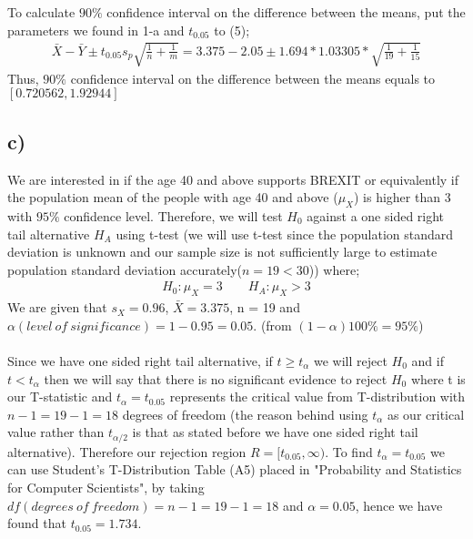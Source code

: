 \documentclass[12pt]{article}
\begin{document}
To calculate $90\%$ confidence interval on the difference between the means, put  the parameters we found in 1-a and  $t_{0.05}$ to (5);
\begin{equation} 
\begin{split}
\bar{X} - \bar{Y} \pm t_{0.05}s_{p}\sqrt{\frac{1}{n}+\frac{1}{m}} = 3.375-2.05 \pm 1.694*1.03305*\sqrt{\frac{1}{19}+\frac{1}{15}}
\end{split}
\end{equation}
Thus, $90\%$ confidence interval on the difference between the means equals to $[0.720562,1.92944]$

\subsection*{c)} We are interested in if the age 40 and above supports BREXIT or equivalently if the population mean of the people with age 40 and above ($\mu_{X}$)  is higher than 3 with $95\%$ confidence level. Therefore, we will test $H_{0}$ against a one sided right tail alternative $H_{A}$ using t-test (we will use t-test since the population standard deviation is unknown and our sample size is not sufficiently large to estimate population standard deviation accurately($n=19 < 30$)) where;
\begin{equation} 
\begin{split}
H_{0}: \mu_{X} = 3 \qquad H_{A}: \mu_{X} > 3
\end{split}
\end{equation}
We are given that $s_{X} = 0.96$, $\bar{X} = 3.375$, n = 19 and $\alpha (level \ of \ significance) = 1 - 0.95 = 0.05$. (from $(1-\alpha)100\% = 95\%$) \\ \\ 
Since we have one sided right tail alternative, if $t \geq t_{\alpha}$ we will reject $H_{0}$ and if $t < t_{\alpha}$ then we will say that there is no significant evidence to reject $H_{0}$ where t is our T-statistic and $t_{\alpha} = t_{0.05}$ represents the critical value from T-distribution with $n-1 = 19 -1 = 18$ degrees of freedom (the reason behind using $t_{\alpha}$ as our critical value rather than $t_{\alpha/2}$ is that as stated before we have one sided right tail alternative). Therefore our rejection region $R = [t_{0.05},\infty)$. To find $t_{\alpha} = t_{0.05}$ we can use Student’s T-Distribution Table (A5) placed in "Probability and Statistics for Computer Scientists", by taking $df (degrees \ of \ freedom) = n-1 = 19 -1 = 18$ and $\alpha = 0.05$, hence we have found that $t_{0.05} = 1.734$. \\ \\
\end{document}
